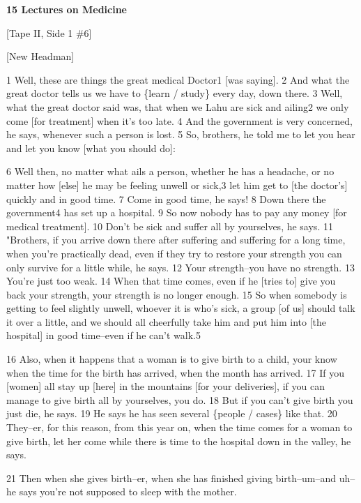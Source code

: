 
\textbf{15 Lectures on Medicine }

[Tape II, Side 1 \#6]

[New Headman]

1 Well, these are things the great medical Doctor1 [was saying]. 2 And what the
great doctor tells us we have to \{learn / study\} every day, down there. 3 Well,
what the great doctor said was, that when we Lahu are sick and ailing2 we only
come [for treatment] when it's too late. 4 And the government is very concerned,
he says, whenever such a person is lost. 5 So, brothers, he told me to let you
hear and let you know [what you should do]:

6 Well then, no matter what ails a person, whether he has a headache, or no matter
how [else] he may be feeling unwell or sick,3 let him get to [the doctor's] quickly
and in good time. 7 Come in good time, he says! 8 Down there the government4 has
set up a hospital. 9 So now nobody has to pay any money [for medical treatment].
10 Don't be sick and suffer all by yourselves, he says. 11 "Brothers,
if you arrive down there after suffering and suffering for a long time, when you're
practically dead, even if they try to restore your strength you can only survive
for a little while, he says. 12 Your strength--you have no strength. 13 You're
just too weak. 14 When that time comes, even if he [tries to] give you back your
strength, your strength is no longer enough. 15 So when somebody is getting to
feel slightly unwell, whoever it is who's sick, a group [of us] should talk it
over a little, and we should all cheerfully take him and put him into [the hospital]
in good time--even if he can't walk.5

16 Also, when it happens that a woman is to give birth to a child, your know when
the time for the birth has arrived, when the month has arrived. 17 If you [women]
all stay up [here] in the mountains [for your deliveries], if you can manage to
give birth all by yourselves, you do. 18 But if you can't give birth you just die,
he says. 19 He says he has seen several \{people / cases\} like that. 20 They--er,
for this reason, from this year on, when the time comes for a woman to give birth,
let her come while there is time to the hospital down in the valley, he says.

21 Then when she gives birth--er, when she has finished giving birth--um--and uh--he
says you're not supposed to sleep with the mother.

